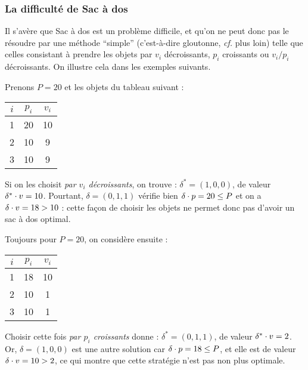 			\subsubsection{La difficulté de \textsf{Sac à dos}}
			
			Il s'avère que \textsf{Sac à dos} est un problème difficile, et qu'on ne peut donc pas le résoudre par une méthode ``simple'' (c'est-à-dire gloutonne, \emph{cf.} plus loin) telle que celles consistant à prendre les objets par $v_i$ décroissants, $p_i$ croissants ou $v_i/p_i$ décroissants. \nt
			On illustre cela dans les exemples suivants.
			
			\colsep{5pt}
			\begin{Exemple}
				Prenons $P = 20$ et les objets du tableau suivant : 
					\begin{center}
					\begin{tabular}[t]{|c|c|c|} \hline
						$i$ & $p_i$ & $v_i$ \\ \hline
						1 & 20 & 10 \\ \hline
						2 & 10 & 9 \\ \hline
						3 & 10 & 9 \\ \hline
					\end{tabular}
					\end{center}
				Si on les choisit \emph{par $v_i$ décroissants}, on trouve : \( \displaystyle \delta^* = (1,0,0) \), de valeur $\delta^* \cdot v = 10$.\nt
				Pourtant, \( \delta = (0,1,1) \) vérifie bien \( \delta \cdot p = 20 \leq P \) et on a  \(\delta \cdot v = 18 > 10\) : cette façon de choisir les objets ne permet donc pas d'avoir un sac à dos optimal.
			\end{Exemple}
			
			\vs{2}
			
			\begin{Exemple}
			Toujours pour \(P = 20\), on considère ensuite : \vs{-3}
				\begin{center}
					\begin{tabular}[t]{| c | c | c |}
						\hline
						$i$ & $p_i$ & $v_i$ \\ \hline
						1 & 18 & 10 \\ \hline
						2 & 10 & 1 \\ \hline
						3 & 10 & 1 \\ \hline
					\end{tabular}
				\end{center}
				Choisir cette fois \emph{par $p_i$ croissants} donne : \( \delta^* = (0,1,1) \), de valeur $\delta^* \cdot v = 2$. \nt
				Or, \( \delta = (1,0,0) \) est une autre solution car \( \delta \cdot p = 18 \leq P \), et elle est de valeur \( \delta \cdot v = 10 > 2 \), ce qui montre que cette stratégie n'est pas non plus optimale.
			\end{Exemple}
			
